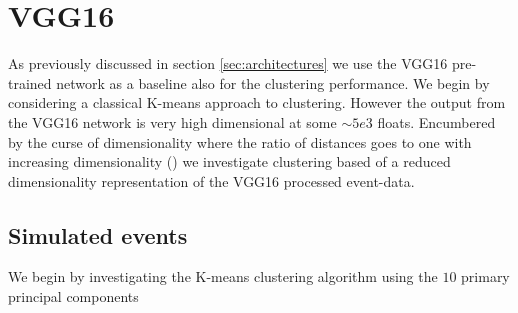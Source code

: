 \section{VGG16}

As previously discussed in section \ref{sec:architectures} we use the VGG16 pre-trained network as a baseline also for the clustering performance. We begin by considering a classical K-means approach to clustering. However the output from the VGG16 network is very high dimensional at some $\sim 5e3$ floats. Encumbered by the curse of dimensionality where the ratio of distances goes to one with increasing dimensionality (\cite{Aggarwal}) we investigate clustering based of a reduced dimensionality representation of the VGG16 processed event-data. 

\subsection{Simulated events}

We begin by investigating the K-means clustering algorithm using the $10$ primary principal components 
